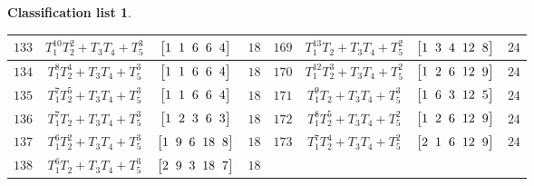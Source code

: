 \documentclass[10pt,a4paper]{amsart}
\theoremstyle{definition}
\newtheorem{class-list}[thm]{Classification list}
\numberwithin{equation}{section}
\begin{document}
\begin{class-list}
\begin{table}[t!]
\begin{tabu}{c|c|c|c||c|c|c|c}
\\
\hline
${133}$&${T_{1}^{10}T_{2}^{2}+T_{3}T_{4}+T_{5}^{3}}$
&$\arraycolsep=1mm\begin{bmatrix}{1} & {1} & {6} & {6} & {4}\end{bmatrix}$&${18}$
&${169}$&${T_{1}^{13}T_{2}+T_{3}T_{4}+T_{5}^{2}}$
&$\arraycolsep=1mm\begin{bmatrix}{1} & {3} & {4} & {12} & {8}\end{bmatrix}$&${24}$
\\
\hline
${134}$&${T_{1}^{8}T_{2}^{4}+T_{3}T_{4}+T_{5}^{3}}$
&$\arraycolsep=1mm\begin{bmatrix}{1} & {1} & {6} & {6} & {4}\end{bmatrix}$&${18}$
&${170}$&${T_{1}^{12}T_{2}^{3}+T_{3}T_{4}+T_{5}^{2}}$
&$\arraycolsep=1mm\begin{bmatrix}{1} & {2} & {6} & {12} & {9}\end{bmatrix}$&${24}$
\\
\hline
${135}$&${T_{1}^{7}T_{2}^{5}+T_{3}T_{4}+T_{5}^{3}}$
&$\arraycolsep=1mm\begin{bmatrix}{1} & {1} & {6} & {6} & {4}\end{bmatrix}$&${18}$
&${171}$&${T_{1}^{9}T_{2}+T_{3}T_{4}+T_{5}^{3}}$
&$\arraycolsep=1mm\begin{bmatrix}{1} & {6} & {3} & {12} & {5}\end{bmatrix}$&${24}$
\\
\hline
${136}$&${T_{1}^{7}T_{2}+T_{3}T_{4}+T_{5}^{3}}$
&$\arraycolsep=1mm\begin{bmatrix}{1} & {2} & {3} & {6} & {3}\end{bmatrix}$&${18}$
&${172}$&${T_{1}^{8}T_{2}^{5}+T_{3}T_{4}+T_{5}^{2}}$
&$\arraycolsep=1mm\begin{bmatrix}{1} & {2} & {6} & {12} & {9}\end{bmatrix}$&${24}$
\\
\hline
${137}$&${T_{1}^{6}T_{2}^{2}+T_{3}T_{4}+T_{5}^{3}}$
&$\arraycolsep=1mm\begin{bmatrix}{1} & {9} & {6} & {18} & {8}\end{bmatrix}$&${18}$
&${173}$&${T_{1}^{7}T_{2}^{4}+T_{3}T_{4}+T_{5}^{2}}$
&$\arraycolsep=1mm\begin{bmatrix}{2} & {1} & {6} & {12} & {9}\end{bmatrix}$&${24}$
\\
\hline
${138}$&${T_{1}^{6}T_{2}+T_{3}T_{4}+T_{5}^{3}}$
&$\arraycolsep=1mm\begin{bmatrix}{2} & {9} & {3} & {18} & {7}\end{bmatrix}$&${18}$

\end{tabu}
\end{table}
\end{class-list}
\end{document}
